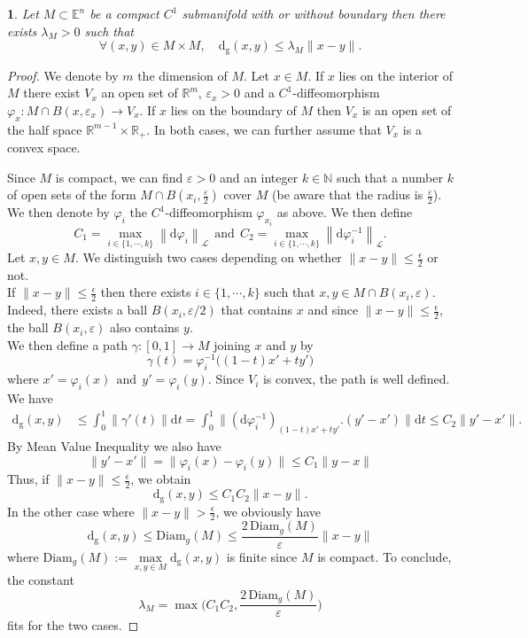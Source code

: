 \documentclass[11pt,reqno,a4paper]{article}%
\newtheorem{lemma}[theorem]{\sc{Lemma}}
\theoremstyle{definition}
\theoremstyle{remark}
\renewcommand{\leq}{\leqslant}
\newcommand{\opnorm}[1]{{\left\| #1 \right\|}_{\mathcal{L}}}
\renewcommand{\d}{\mathrm{d}}
\newcommand{\R}{\mathbb{R}}
\newcommand{\E}{\mathbb{E}}
\renewcommand{\d}{\mathrm{d}}
\begin{document}
\begin{lemma} \label{lem: distance_geodesique_norme_R_n}
Let $M\subset \E^n$ be a compact $C^1$ submanifold with or without boundary then there exists $\lambda_M >0$ such that
\[\forall (x,y)\in M\times M,\quad \d_\text{g}(x,y) \leq \lambda_M \| x - y \|.\]
\end{lemma}

\begin{proof}
We denote by $m$ the dimension of $M$. Let $x \in M$. 
If $x$ lies on the interior of $M$ there exist $V_x$ an open set of $\R^m$, $\varepsilon_x > 0$ and a $C^1$-diffeomorphism $\varphi_x : M \cap B(x,\varepsilon_x) \to  V_x$.
If $x$ lies on the boundary of $M$ then $V_x$ is an open set of the half space $\R^{m-1} \times \R_+$.
In  both cases, we can further assume that $V_x$ is a convex space. 

Since $M$ is compact, we can find $\varepsilon >0$ and an integer $k \in \mathbb{N}$ such that a number $k$ of open sets of the form $M \cap B(x_i,\frac{\varepsilon}{2})$ cover $M$ (be aware that the radius is $\frac{\varepsilon}{2}$). We then denote by $\varphi_i$ the $C^1$-diffeomorphism $\varphi_{x_i}$ as above.
We then define 
$$ C_1 = \underset{i \in \{ 1 , \cdots, k \}}{\max} \opnorm{\d \varphi_i} ~~ \text{and} ~~  C_2 = \underset{i \in \{ 1 , \cdots, k \}}{\max} \opnorm{\d \varphi^{-1}_i}.$$
Let $x,y \in M$. We distinguish two cases depending on whether $\|x - y\| \leq \frac{\epsilon}{2}$ or not.\\
If $\|x - y\| \leq \frac{\epsilon}{2}$ then there exists $i \in \{ 1, \cdots, k \}$ such that $x,y \in M \cap B(x_i,\varepsilon)$. Indeed, there exists a ball $B(x_i,\varepsilon/2)$ that contains $x$ and since $\|x - y\| \leq \frac{\epsilon}{2}$, the ball $B(x_i,\varepsilon)$ also contains $y$.\\

We then define a path $\gamma:[0,1]\to M$ joining $x$ and $y$ by 
\[\gamma(t)=\varphi_i^{-1} \big( (1-t) x' + t y' \big)\]
where $x' = \varphi_i(x) ~~ \text{and} ~~ y' = \varphi_i(y).$ Since $V_i$ is convex, the path is well defined. We have
\begin{align*}
    \d_{\text{g}}(x,y) &\leq \int_0^1 \|\gamma'(t)\| \d t = \int_0^1 \| (\d \varphi_i^{-1})_{ (1-t) x' + t y'}.(y'-x') \|  \d t \leq C_2  \| y'-x' \|.
\end{align*}
By Mean Value Inequality we also have
\[ \| y'-x' \| = \| \varphi_i(x) -  \varphi_i(y)\| \leq C_1 \| y - x \|  \]
Thus, if $\|x -y\| \leq \frac{\epsilon}{2}$, we obtain
$$ \d_{\text{g}}(x,y) \leq C_1 C_2 \|x - y\|.$$
In the other case where $\|x -y\| > \frac{\epsilon}{2}$, we obviously have
\[ \d_{\text{g}}(x,y)\leq \mathrm{Diam}_g(M) \leq \frac{2 \, \mathrm{Diam}_g(M)}{\varepsilon}\|x - y\|\]
where $\mathrm{Diam}_g(M) := \underset{x,y\in M}{\max} \d_{\text{g}}(x,y)$ is finite since $M$ is compact.
To conclude, the constant
$$\lambda_M = \max \Big( C_1 C_2, \frac{2 \, \mathrm{Diam}_g(M)}{\varepsilon} \Big)$$
fits for the two cases.
\end{proof}
\end{document}
